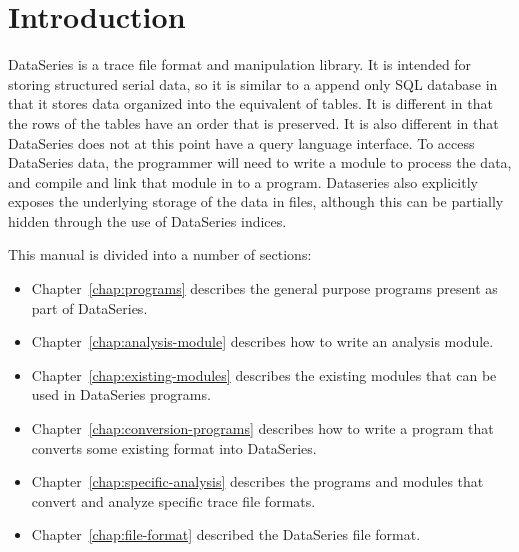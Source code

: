 \chapter{Introduction}\label{chap:introduction}

DataSeries\cite{dataseries-tr} is a trace file format and manipulation
library.  It is intended for storing structured serial data, so it is
similar to a append only SQL database\cite{wikipedia:sqldb} in that it
stores data organized into the equivalent of tables.  It is different
in that the rows of the tables have an order that is preserved.  It is
also different in that DataSeries does not at this point have a query
language interface.  To access DataSeries data, the programmer will
need to write a module to process the data, and compile and link that
module in to a program.  Dataseries also explicitly exposes the
underlying storage of the data in files, although this can be
partially hidden through the use of DataSeries indices.

This manual is divided into a number of sections:
\begin{itemize} 

\item Chapter~\ref{chap:programs} describes the general purpose
programs present as part of DataSeries.

\item Chapter~\ref{chap:analysis-module} describes how to write an
analysis module.

\item Chapter~\ref{chap:existing-modules} describes the existing
modules that can be used in DataSeries programs.

\item Chapter~\ref{chap:conversion-programs} describes how to write a
program that converts some existing format into DataSeries.

\item Chapter~\ref{chap:specific-analysis} describes the programs and 
modules that convert and analyze specific trace file formats.

\item Chapter~\ref{chap:file-format} described the DataSeries file
format.

\end{itemize}
